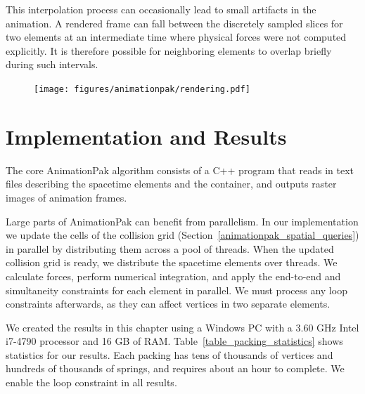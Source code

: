 This interpolation process can occasionally lead to small artifacts in 
the animation.  A rendered frame can fall between
the discretely sampled slices for two elements at an intermediate time
where physical forces were not computed explicitly.  It is therefore
possible for neighboring elements to overlap briefly during such intervals.

\begin{figure}
\centering
\texttt{[image: figures/animationpak/rendering.pdf]} 
\caption[An illustration of rendering spacetime elements]
{\label{fig_animationpak_render} 
}
\end{figure}


\section{Implementation and Results}
\label{animationpak_implementation_and_results}


The core AnimationPak algorithm consists of a C++ program that reads 
in text files describing the spacetime elements and the container, 
and outputs raster images of animation frames.

Large parts of AnimationPak can benefit from parallelism.  In
our implementation we update the cells of the collision grid
(Section~\ref{animationpak_spatial_queries}) in parallel by distributing them
across a pool of threads.  When the updated collision grid is ready,
we distribute the spacetime elements over threads.  We calculate
forces, perform numerical integration, and apply the end-to-end and
simultaneity constraints for each element in parallel.  We must
process any loop constraints afterwards, as they can affect vertices in
two separate elements.

We created the results in this chapter using a Windows PC with a 
3.60 GHz Intel i7-4790 processor and 16 GB of RAM. 
Table~\ref{table_packing_statistics} shows statistics for our results.
Each packing has tens of thousands of vertices and hundreds of thousands
of springs, and requires about an hour to complete.
We enable the loop constraint in all results.  

